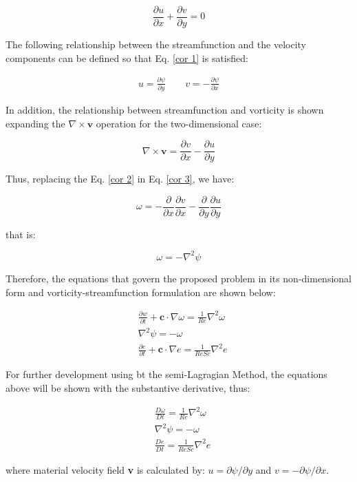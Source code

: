 \begin{equation} \label{cor 1}
 \frac{\partial u}{\partial x}
 +
 \frac{\partial v}{\partial y}
 =
 0
\end{equation}
 
\medskip
The following relationship between the streamfunction and
 the velocity components can be defined so that
 Eq. \ref{cor 1} is satisfied:


\begin{equation} \label{cor 2}
\begin{aligned}
 u = \frac{\partial \psi}{\partial y}
 \qquad
 v = - \frac{\partial \psi}{\partial x}
\end{aligned}
\end{equation}

\medskip
In addition, the relationship between streamfunction
and vorticity is shown expanding the
$\nabla \times \textbf{v}$ operation
for the two-dimensional case:


\begin{equation} \label{cor 3}
 \nabla \times \textbf{v}
 = 
 \frac{\partial v}{\partial x}
 - 
 \frac{\partial u}{\partial y}
\end{equation}

\medskip
\noindent
Thus, replacing the 
Eq. \ref{cor 2} in Eq. \ref{cor 3},
we have:

\begin{equation}
 \omega
 =
 - 
 \frac{\partial}{\partial x} \frac{\partial v}{\partial x}
 -
 \frac{\partial}{\partial y} \frac{\partial u}{\partial y}
\end{equation}

\medskip
\noindent
that is:

\begin{equation}
 \omega
 = 
 -
 \nabla^{2} \psi
\end{equation}

\medskip
Therefore, the equations that govern the proposed problem
in its non-dimensional form and vorticity-streamfunction formulation
are shown below:

\begin{align}
& \frac{\partial w}{\partial t}
 +
 \textbf{c} \cdot \nabla \omega
 =
 \frac{1}{Re} \nabla^{2} \omega
 \\[10pt] 
& \nabla^{2} \psi
 = 
 - 
 \omega \\[10pt]
& \frac{\partial e}{\partial t}
 +
 \textbf{c} \cdot \nabla e
 =
 \frac{1}{ReSc} \nabla^{2} e
\end{align}

\medskip
For further development using bt the semi-Lagragian Method,
the equations above will be shown with the substantive derivative,
thus:

\begin{align}
& \frac{D \omega}{D t}
 =
 \frac{1}{Re} \nabla^{2} \omega \label{vorticidade}
 \\[10pt] 
& \nabla^{2} \psi
 = 
 - 
 \omega \label{corrente} \\[10pt]
& \frac{D e}{Dt}
 =
 \frac{1}{ReSc} \nabla^{2} e \label{especie quimica}
\end{align}

\medskip
\noindent
where material velocity field \textbf{v} is calculated by:
$u = \partial \psi / \partial y$ and 
$v = - \partial \psi / \partial x$. 
